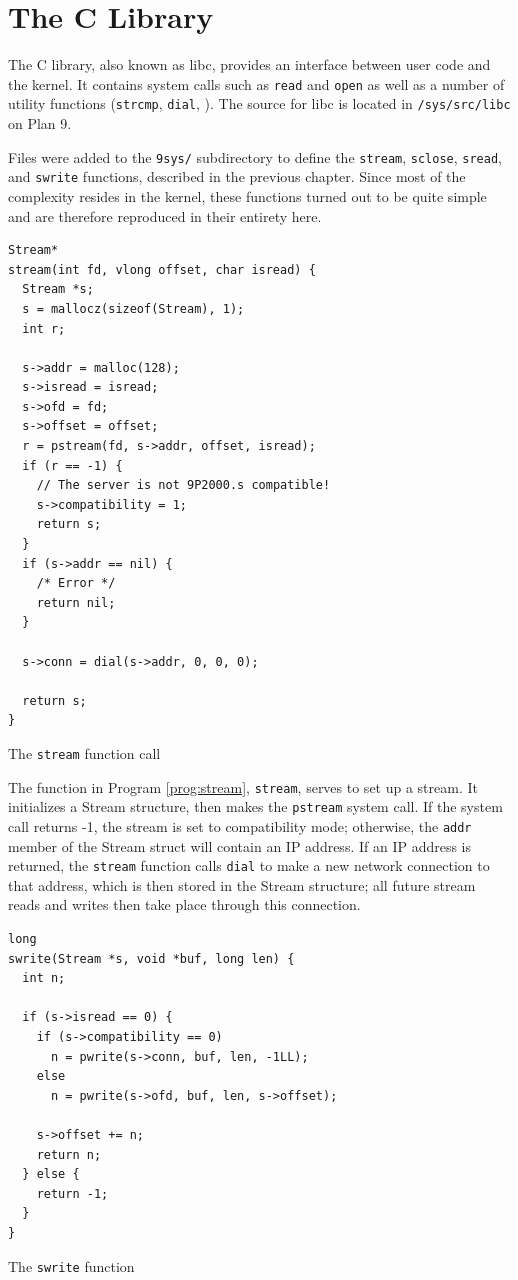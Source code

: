 \documentclass[11pt,american]{report}
\begin{document}
\section{The C Library}

The C library, also known as libc, provides an interface between user code and the kernel. It contains system calls such as {\tt read} and {\tt open} as well as a number of utility functions ({\tt strcmp}, {\tt dial}, \etc). The source for libc is located in {\tt /sys/src/libc} on Plan 9.

Files were added to the {\tt 9sys/} subdirectory to define the {\tt stream}, {\tt sclose}, {\tt sread}, and {\tt swrite} functions, described in the previous chapter. Since most of the complexity resides in the kernel, these functions turned out to be quite simple and are therefore reproduced in their entirety here.

\begin{program}
\begin{verbatim}
Stream*
stream(int fd, vlong offset, char isread) {
  Stream *s;
  s = mallocz(sizeof(Stream), 1);
  int r;

  s->addr = malloc(128);
  s->isread = isread;
  s->ofd = fd;
  s->offset = offset;
  r = pstream(fd, s->addr, offset, isread);
  if (r == -1) {
    // The server is not 9P2000.s compatible!
    s->compatibility = 1;
    return s;
  }
  if (s->addr == nil) {
    /* Error */
    return nil;
  }

  s->conn = dial(s->addr, 0, 0, 0);

  return s;
}
\end{verbatim}
\caption{The {\tt stream} function call}
\label{prog:stream}
\end{program}

The function in Program \ref{prog:stream}, {\tt stream}, serves to set up a stream. It initializes a Stream structure, then makes the {\tt pstream} system call. If the system call returns -1, the stream is set to compatibility mode; otherwise, the {\tt addr} member of the Stream struct will contain an IP address. If an IP address is returned, the {\tt stream} function calls {\tt dial} to make a new network connection to that address, which is then stored in the Stream structure; all future stream reads and writes then take place through this connection.

\begin{program}
\begin{verbatim}
long
swrite(Stream *s, void *buf, long len) {
  int n;

  if (s->isread == 0) {
    if (s->compatibility == 0)
      n = pwrite(s->conn, buf, len, -1LL);
    else
      n = pwrite(s->ofd, buf, len, s->offset);

    s->offset += n;
    return n;
  } else {
    return -1;
  }
}
\end{verbatim}
\caption{The {\tt swrite} function}
\label{prog:swrite}
\end{program}
\end{document}
